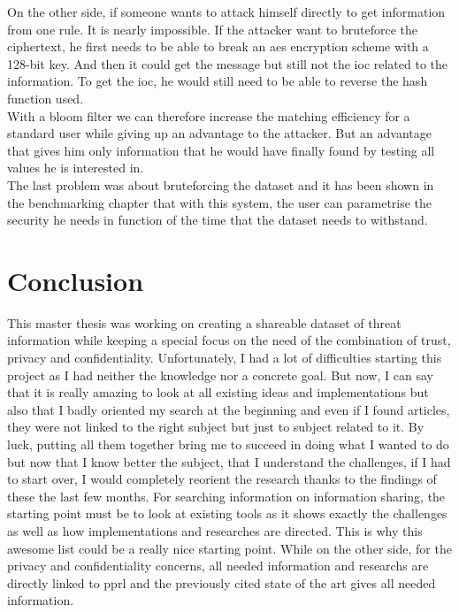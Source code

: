 \documentclass{eplmastersthesis}
\begin{document}
On the other side, if someone wants to attack himself directly to get information from one rule. It is nearly impossible. If the attacker want to bruteforce the ciphertext, he first needs to be able to break an \gls{aes} encryption scheme with a 128-bit key. And then it could get the message but still not the \gls{ioc} related to the information.
To get the \gls{ioc}, he would still need to be able to reverse the hash function used.\\

With a bloom filter we can therefore increase the matching efficiency for a standard user while giving up an advantage to the attacker. But an advantage that gives him only information that he would have finally found by testing all values he is interested in.\\

The last problem was about bruteforcing the dataset and it has been shown in the benchmarking chapter that with this system, the user can parametrise the security he needs in function of the time that the dataset needs to withstand. 

\section{Conclusion}
This master thesis was working on creating a shareable dataset of threat information while keeping a special focus on the need of the combination of trust, privacy and confidentiality.
Unfortunately, I had a lot of difficulties starting this project as I had neither the knowledge nor a concrete goal. But now, I can say that it is really amazing to look at all existing ideas and implementations but also that I badly oriented my search at the beginning and even if I found articles, they were not linked to the right subject but just to subject related to it. By luck, putting all them together bring me to succeed in doing what I wanted to do but now that I know better the subject, that I understand the challenges, if I had to start over, I would completely reorient the research thanks to the findings of these the last few months.
For searching information on information sharing, the starting point must be to look at existing tools as it shows exactly the challenges as well as how implementations and researches are directed. This is why this awesome list \cite{AwesomeTreat} could be a really nice starting point.
While on the other side, for the privacy and confidentiality concerns, all needed information and researchs are directly linked to \gls{pprl} and the previously cited state of the art \cite{vatsalanprivacy} gives all needed information.\\
\end{document}
